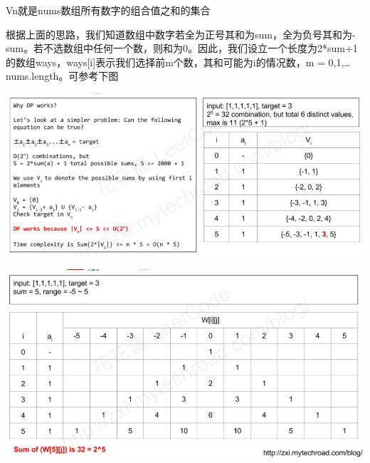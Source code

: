 \documentclass[9pt, b5paper]{article}
\begin{document}
Vn就是nums数组所有数字的组合值之和的集合

根据上面的思路，我们知道数组中数字若全为正号其和为sum，全为负号其和为-sum。若不选数组中任何一个数，则和为0。因此，我们设立一个长度为2*sum+1的数组ways，ways[i]表示我们选择前m个数，其和可能为i的情况数，m = 0,1,\ldots{}nums.length。可参考下图

\includegraphics[width=.9\linewidth]{./pic/targetSum.png}

\includegraphics[width=.9\linewidth]{./pic/targetSum2.png}
\end{document}
